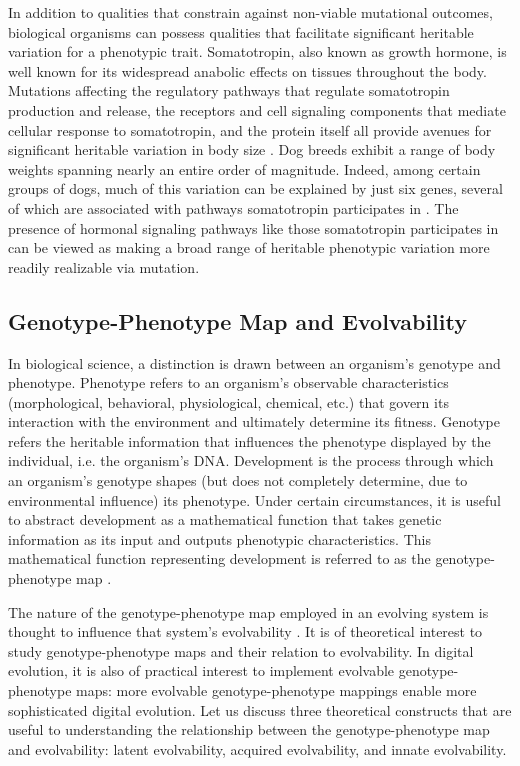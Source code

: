 In addition to qualities that constrain against non-viable mutational outcomes, biological organisms can possess qualities that facilitate significant heritable variation for a phenotypic trait.
Somatotropin, also known as growth hormone, is well known for its widespread anabolic effects on tissues throughout the body.
Mutations affecting the regulatory pathways that regulate somatotropin production and release, the receptors and cell signaling components that mediate cellular response to somatotropin, and the protein itself all provide avenues for significant heritable variation in body size \cite{devesa2016multiple}.
Dog breeds exhibit a range of body weights spanning nearly an entire order of magnitude.
Indeed, among certain groups of dogs, much of this variation can be explained by just six genes, several of which are associated with pathways somatotropin participates in \cite{rimbault2013derived}.
The presence of hormonal signaling pathways like those somatotropin participates in can be viewed as making a broad range of heritable phenotypic variation more readily realizable via mutation.

\subsection{Genotype-Phenotype Map and Evolvability}

In biological science, a distinction is drawn between an organism's genotype and phenotype.
Phenotype refers to an organism's observable characteristics (morphological, behavioral, physiological, chemical, etc.) that govern its interaction with the environment and ultimately determine its fitness.
Genotype refers the heritable information that influences the phenotype displayed by the individual, i.e. the organism's DNA.
Development is the process through which an organism's genotype shapes (but does not completely determine, due to environmental influence) its phenotype.
Under certain circumstances, it is useful to abstract development as a mathematical function that takes genetic information as its input and outputs phenotypic characteristics.
This mathematical function representing development is referred to as the genotype-phenotype map \cite{alberch1991genes}.

The nature of the genotype-phenotype map employed in an evolving system is thought to influence that system's evolvability \cite{pigliucci2010genotype}.
It is of theoretical interest to study genotype-phenotype maps and their relation to evolvability.
In digital evolution, it is also of practical interest to implement evolvable genotype-phenotype maps: more evolvable genotype-phenotype mappings enable more sophisticated digital evolution.
Let us discuss three theoretical constructs that are useful to understanding the relationship between the genotype-phenotype map and evolvability: latent evolvability, acquired evolvability, and innate evolvability.


